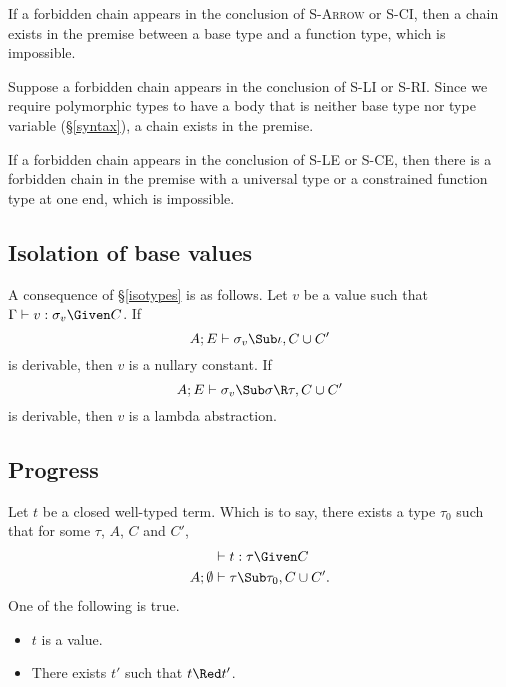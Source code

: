 \documentclass{amsart}
\theoremstyle{definition}
\begin{document}
If a forbidden chain appears in the conclusion of
\textsc{S-Arrow} or \textsc{S-CI}, then a chain exists in the
premise between a base type and a function type, which is
impossible.

Suppose a forbidden chain appears in the conclusion of
\textsc{S-LI} or \textsc{S-RI}. Since we require polymorphic
types to have a body that is neither base type nor type variable
(\S\ref{syntax}), a chain exists in the premise.

If a forbidden chain appears in the conclusion of \textsc{S-LE}
or \textsc{S-CE}, then there is a forbidden chain in the premise
with a universal type or a constrained function type at one end,
which is impossible.

\subsection{Isolation of base values}
\label{isovalues}
A consequence of \S\ref{isotypes} is as follows. Let $v$ be a
value such that $\Gamma\vdash v:\sigma_v\Given C$. If
\[
A;E\vdash \sigma_v\Sub\iota,C\cup C'
\]
is derivable, then $v$ is a nullary constant. If
\[
A;E\vdash \sigma_v\Sub\sigma\R\tau,C\cup C'
\]
is derivable, then $v$ is a lambda abstraction.

\subsection{Progress} Let $t$ be a closed well-typed term. Which
is to say, there exists a type $\tau_0$ such that for some
$\tau$, $A$, $C$ and $C'$,
\begin{align*}
&\vdash t:\tau\Given C\\
A;\emptyset&\vdash \tau\Sub\tau_0,C\cup C'.
\end{align*}
One of the following is true.
\begin{itemize}
\item $t$ is a value.
\item There exists $t'$ such that $t\Red t'$.
\end{itemize}
\end{document}
